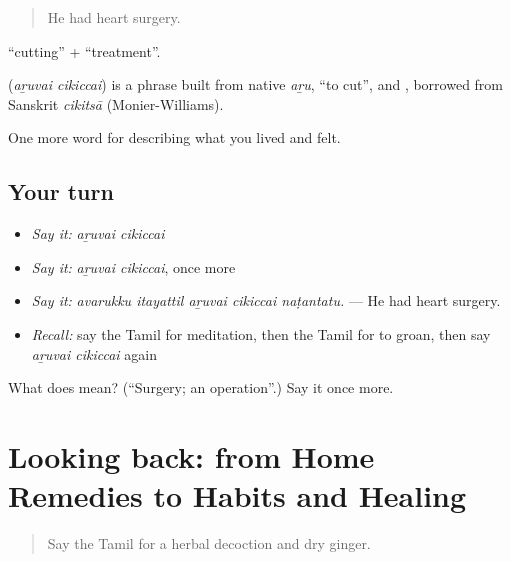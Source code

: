 \begin{quote}
He had heart surgery.
\end{quote}

 \textquotedblleft{}cutting\textquotedblright{} +  \textquotedblleft{}treatment\textquotedblright{}.

\begin{cousinweb}
\textbf{ } (\emph{aṟuvai cikiccai}) is a phrase built from native  \emph{aṟu}, \textquotedblleft{}to cut\textquotedblright{}, and , borrowed from Sanskrit \emph{cikitsā} (Monier-Williams).
\end{cousinweb}

\begin{grammarlens}[title={What you've built}]
One more word for describing what you lived and felt.
\end{grammarlens}

\subsection*{Your turn}
\begin{itemize}
\raggedright
  \item \emph{Say it:} \emph{aṟuvai cikiccai}
  \item \emph{Say it:} \emph{aṟuvai cikiccai}, once more
  \item \emph{Say it:} \emph{avarukku itayattil aṟuvai cikiccai naṭantatu.} — He had heart surgery.
  \item \emph{Recall:} say the Tamil for meditation, then the Tamil for to groan, then say \emph{aṟuvai cikiccai} again
\end{itemize}

\begin{tcolorbox}[breakable,colback=teal!4,colframe=teal!35!black,title={Before you move on}]
What does   mean? (\textquotedblleft{}Surgery; an operation\textquotedblright{}.) Say it once more.
\end{tcolorbox}
\section[(dialogue)]{Looking back: from Home Remedies to Habits and Healing}

\label{lesson:TA-R491-review-485-491}



\begin{quote}
Say the Tamil for a herbal decoction and dry ginger.
\end{quote}

